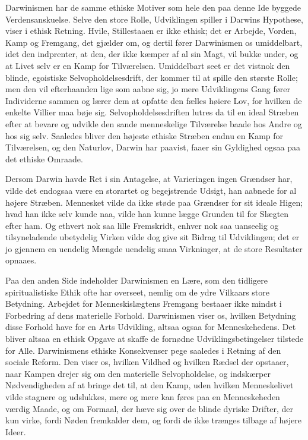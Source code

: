 \documentclass[12pt,a4paper]{article}
\begin{document}
Darwinismen har de samme ethiske Motiver som hele den
paa denne Ide byggede Verdensanskuelse. Selve den store
Rolle, Udviklingen spiller i Darwins Hypothese, viser
i ethisk Retning. Hvile, Stillestaaen er ikke ethisk; det er
Arbejde, Vorden, Kamp og Fremgang, det gjælder om, og
dertil fører Darwinismen os umiddelbart, idet den indprenter,
at den, der ikke kæmper af al sin Magt, vil bukke under,
og at Livet selv er en Kamp for Tilværelsen. Umiddelbart
seet er det vistnok den blinde, egoistiske Selvopholdelsesdrift,
der kommer til at spille den største Rolle; men den vil
efterhaanden lige som aabne sig, jo mere Udviklingens Gang
fører Individerne sammen og lærer dem at opfatte den
fælles høiere Lov, for hvilken de enkelte Villier maa bøje
sig. Selvopholdelsesdriften lutres da til en ideal Stræben
efter at bevare og udvikle den sande menneskelige Tilværelse
baade hos Andre og hos sig selv. Saaledes bliver den
højeste ethiske Stræben endnu en Kamp for Tilværelsen, og
den Naturlov, Darwin har paavist, faaer sin Gyldighed
ogsaa paa det ethiske Omraade.

Dersom Darwin havde Ret i sin Antagelse, at Varieringen
ingen Grændser har, vilde det endogsaa være en storartet
og begejstrende Udsigt, han aabnede for al højere Stræben.
Mennesket vilde da ikke støde paa Grændser for sit ideale
Higen; hvad han ikke selv kunde naa, vilde han kunne
lægge Grunden til for Slægten efter ham. Og ethvert nok
saa lille Fremskridt, enhver nok saa uanseelig og
tilsyneladende ubetydelig Virken vilde dog give sit Bidrag
til Udviklingen; det er jo gjennem en uendelig Mængde
uendelig smaa Virkninger, at de store Resultater opnaaes.

Paa den anden Side indeholder Darwinismen en Lære,
som den tidligere spiritualistiske Ethik ofte har overseet,
nemlig om de ydre Vilkaars store Betydning. Arbejdet for
Menneskislægtens Fremgang bestaaer ikke mindst i Forbedring
af dens materielle Forhold. Darwinismen viser os, hvilken
Betydning disse Forhold have for en Arts Udvikling, altsaa
ogsaa for Menneskehedens. Det bliver altsaa en ethisk
Opgave at skaffe de fornødne Udviklingsbe\-tingelser tilstede
for Alle. Darwinismens ethiske Konsekvenser pege saaledes i
Retning af den sociale Reform. Den viser os, hvilken Vildhed
og hvilken Rædsel der opstaaer, naar Kampen drejer sig om
den materielle Selvopholdelse, og indskærper Nødvendigheden
af at bringe det til, at den Kamp, uden hvilken
Menneskelivet vilde stagnere og udslukkes, mere og mere
kan føres paa en Menneskeheden værdig Maade, og om
Formaal, der hæve sig over de blinde dyriske Drifter, der
kun virke, fordi Nøden fremkalder dem, og fordi de ikke
trænges tilbage af højere Ideer.
\end{document}
